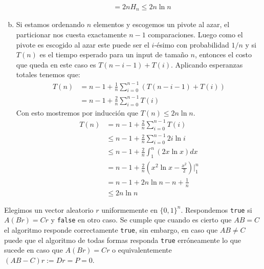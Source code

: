\documentclass[dcc,uchile]{fcfmcourse}
\theoremstyle{plain}
\theoremstyle{definition}
\begin{document}
\begin{problems}
\begin{enumerate}[a)]
\begin{align*}
        &= 2n H_{n} \le 2n\ln{n}
    \end{align*}
    \item Si estamos ordenando $n$ elementos y escogemos un pivote al azar, el particionar nos cuesta exactamente $n-1$ comparaciones. Luego como el pivote es escogido al azar este puede ser el $i$-ésimo con probabilidad $1/n$ y si $T(n)$ es el tiempo esperado para un input de tamaño $n$, entonces el costo que queda en este caso es $T(n-i-1) + T(i)$. Aplicando esperanzas totales tenemos que:
    \begin{align*}
        T(n) &= n-1 + \frac{1}{n}\sum_{i=0}^{n-1}(T(n-i-1) + T(i))\\
        &= n-1 + \frac{2}{n}\sum_{i=0}^{n-1}T(i)
    \end{align*}
    Con esto mostremos por inducción que $T(n) \le 2n\ln{n}$.\\
    \begin{align*}
        T(n) &= n-1 + \frac{2}{n}\sum_{i=0}^{n-1}T(i) \\
        &\le n-1 + \frac{2}{n}\sum_{i=0}^{n-1}2i\ln{i}\\
        &\le n-1 + \frac{2}{n}\int_{1}^{n}(2x\ln{x})dx\\
        &= n-1 + \frac{2}{n} (x^2\ln{x} - \frac{x^2}{2})\Big|_1^n\\
        &= n-1 + 2n\ln{n} - n + \frac{1}{n}\\
        &\le 2n\ln{n}
    \end{align*}

\end{enumerate}
\problem
Elegimos un vector aleatorio $r$ uniformemente en $\{0, 1\}^n$. Respondemos \texttt{true} si $A(Br) = Cr$ y \texttt{false} en otro caso. Se cumple que cuando es cierto que $AB = C$ el algoritmo responde correctamente \texttt{true}, sin embargo, en caso que $AB \not = C$ puede que el algoritmo de todas formas responda \texttt{true} erróneamente lo que sucede en caso que $A(Br) = Cr$ o equivalentemente $(AB-C) r := Dr = P = 0$.\\


\end{problems}
\end{document}
